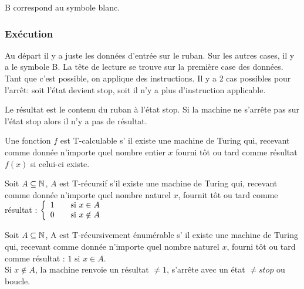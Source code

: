 \begin{mydef}
		B correspond au symbole blanc.
\end{mydef}

\subsubsection{Exécution}
Au départ il y a juste les données d'entrée sur le ruban. Sur les autres cases, il y a 
le symbole B. La tête de lecture se trouve sur la première case des données. Tant que 
c'est possible, on applique des instructions. Il y a 2 cas possibles pour l'arrêt: soit 
l'état devient stop, soit il n'y a plus d'instruction applicable.

 Le résultat est le contenu du ruban à l'état stop. Si la machine 
ne s'arrête pas sur l'état stop alors il n'y a pas de résultat.

\begin{mydef}[T-calculable] Une fonction $f$ est T-calculable s’ il existe une machine 
de Turing qui, 
	recevant comme donnée n'importe quel nombre entier $x$ fourni tôt ou tard 
	comme résultat $f(x)$ si celui-ci existe.
\end{mydef}

\begin{mydef}[T-récursif] Soit $A\subseteq \mathbb{N}$, $A$ est T-récursif s’il existe 
	une machine de Turing qui, recevant comme donnée n'importe quel nombre 
	naturel $x$, fournit tôt ou tard comme résultat : 
	$ \left\{
		\begin{array}{l l}
			1 & \quad \text{si $x\in A$}\\
    		0 & \quad \text{si $x\notin A$}
		\end{array} \right.$
\end{mydef}

\begin{mydef} Soit $A\subseteq \mathbb{N}$, A est 
	T-récursivement énumérable s’ il existe 
	une machine de Turing qui, recevant comme donnée n'importe quel nombre 
	naturel $x$, fourni tôt ou tard comme résultat : $ 1 \text{ si } x \in A$.\\
	Si $x \notin A$, la machine renvoie un résultat $\neq 1$, s'arrête avec un
	état $\neq stop$ ou boucle.
\end{mydef}

